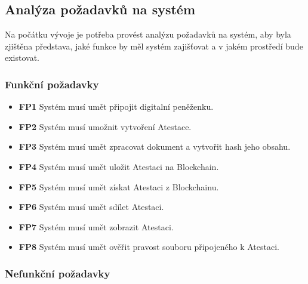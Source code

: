 \subsection{Analýza požadavků na systém}

Na počátku vývoje je potřeba provést analýzu požadavků na systém, aby byla zjištěna představa, jaké funkce by měl systém zajišťovat a v jakém prostředí bude existovat.




\subsubsection{Funkční požadavky}


\begin{itemize}

	
	\item \textbf{FP1} Systém musí umět připojit digitalní peněženku.
	
	\item \textbf{FP2} Systém musí umožnit vytvoření Atestace.
	
	\item \textbf{FP3} Systém musí umět zpracovat dokument a vytvořit hash jeho obsahu.
	
	\item \textbf{FP4} Systém musí umět uložit Atestaci na Blockchain.
	
	\item \textbf{FP5} Systém musí umět získat Atestaci z Blockchainu.
	
	\item \textbf{FP6} Systém musí umět sdílet Atestaci.
	
	\item \textbf{FP7} Systém musí umět zobrazit Atestaci.
	
	\item \textbf{FP8} Systém musí umět ověřit pravost souboru připojeného k Atestaci.


\end{itemize}




\subsubsection{Nefunkční požadavky}



